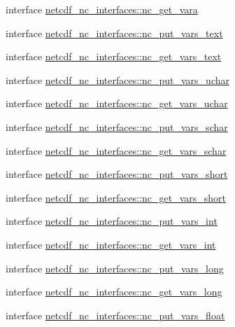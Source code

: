 \begin{DoxyCompactItemize}
\item 
interface \hyperlink{interfacenetcdf__nc__interfaces_1_1nc__get__vara}{netcdf\+\_\+nc\+\_\+interfaces\+::nc\+\_\+get\+\_\+vara}
\item 
interface \hyperlink{interfacenetcdf__nc__interfaces_1_1nc__put__vars__text}{netcdf\+\_\+nc\+\_\+interfaces\+::nc\+\_\+put\+\_\+vars\+\_\+text}
\item 
interface \hyperlink{interfacenetcdf__nc__interfaces_1_1nc__get__vars__text}{netcdf\+\_\+nc\+\_\+interfaces\+::nc\+\_\+get\+\_\+vars\+\_\+text}
\item 
interface \hyperlink{interfacenetcdf__nc__interfaces_1_1nc__put__vars__uchar}{netcdf\+\_\+nc\+\_\+interfaces\+::nc\+\_\+put\+\_\+vars\+\_\+uchar}
\item 
interface \hyperlink{interfacenetcdf__nc__interfaces_1_1nc__get__vars__uchar}{netcdf\+\_\+nc\+\_\+interfaces\+::nc\+\_\+get\+\_\+vars\+\_\+uchar}
\item 
interface \hyperlink{interfacenetcdf__nc__interfaces_1_1nc__put__vars__schar}{netcdf\+\_\+nc\+\_\+interfaces\+::nc\+\_\+put\+\_\+vars\+\_\+schar}
\item 
interface \hyperlink{interfacenetcdf__nc__interfaces_1_1nc__get__vars__schar}{netcdf\+\_\+nc\+\_\+interfaces\+::nc\+\_\+get\+\_\+vars\+\_\+schar}
\item 
interface \hyperlink{interfacenetcdf__nc__interfaces_1_1nc__put__vars__short}{netcdf\+\_\+nc\+\_\+interfaces\+::nc\+\_\+put\+\_\+vars\+\_\+short}
\item 
interface \hyperlink{interfacenetcdf__nc__interfaces_1_1nc__get__vars__short}{netcdf\+\_\+nc\+\_\+interfaces\+::nc\+\_\+get\+\_\+vars\+\_\+short}
\item 
interface \hyperlink{interfacenetcdf__nc__interfaces_1_1nc__put__vars__int}{netcdf\+\_\+nc\+\_\+interfaces\+::nc\+\_\+put\+\_\+vars\+\_\+int}
\item 
interface \hyperlink{interfacenetcdf__nc__interfaces_1_1nc__get__vars__int}{netcdf\+\_\+nc\+\_\+interfaces\+::nc\+\_\+get\+\_\+vars\+\_\+int}
\item 
interface \hyperlink{interfacenetcdf__nc__interfaces_1_1nc__put__vars__long}{netcdf\+\_\+nc\+\_\+interfaces\+::nc\+\_\+put\+\_\+vars\+\_\+long}
\item 
interface \hyperlink{interfacenetcdf__nc__interfaces_1_1nc__get__vars__long}{netcdf\+\_\+nc\+\_\+interfaces\+::nc\+\_\+get\+\_\+vars\+\_\+long}
\item 
interface \hyperlink{interfacenetcdf__nc__interfaces_1_1nc__put__vars__float}{netcdf\+\_\+nc\+\_\+interfaces\+::nc\+\_\+put\+\_\+vars\+\_\+float}

\end{DoxyCompactItemize}
